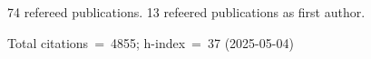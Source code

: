 74 refereed publications. 13 refeered publications as first author.

Total citations~=~4855; h-index~=~37 (2025-05-04)